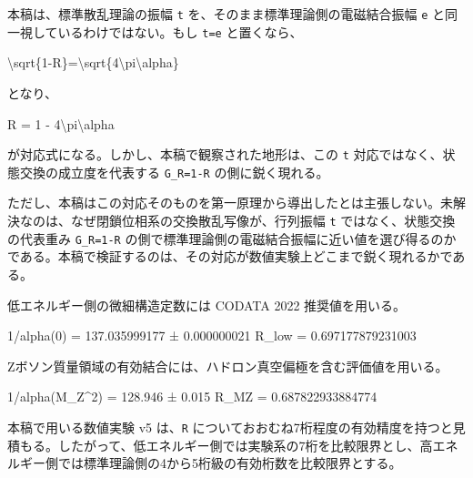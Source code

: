 \documentclass[
]{article}
\newenvironment{Shaded}{}{}
\newcommand{\NormalTok}[1]{#1}
\begin{document}
本稿は、標準散乱理論の振幅 \texttt{\textbar{}t\textbar{}}
を、そのまま標準理論側の電磁結合振幅 \texttt{e}
と同一視しているわけではない。もし \texttt{\textbar{}t\textbar{}=e}
と置くなら、

\begin{Shaded}
\begin{Highlighting}[]
\NormalTok{\textbackslash{}sqrt\{1{-}R\}=\textbackslash{}sqrt\{4\textbackslash{}pi\textbackslash{}alpha\}}
\end{Highlighting}
\end{Shaded}

となり、

\begin{Shaded}
\begin{Highlighting}[]
\NormalTok{R = 1 {-} 4\textbackslash{}pi\textbackslash{}alpha}
\end{Highlighting}
\end{Shaded}

が対応式になる。しかし、本稿で観察された地形は、この
\texttt{\textbar{}t\textbar{}} 対応ではなく、状態交換の成立度を代表する
\texttt{G\_R=1-R} の側に鋭く現れる。

ただし、本稿はこの対応そのものを第一原理から導出したとは主張しない。未解決なのは、なぜ閉鎖位相系の交換散乱写像が、行列振幅
\texttt{\textbar{}t\textbar{}} ではなく、状態交換の代表重み
\texttt{G\_R=1-R}
の側で標準理論側の電磁結合振幅に近い値を選び得るのかである。本稿で検証するのは、その対応が数値実験上どこまで鋭く現れるかである。

低エネルギー側の微細構造定数には CODATA 2022 推奨値を用いる。

\begin{Shaded}
\begin{Highlighting}[]
\NormalTok{1/alpha(0) = 137.035999177 ± 0.000000021}
\NormalTok{R\_low      = 0.697177879231003}
\end{Highlighting}
\end{Shaded}

Zボソン質量領域の有効結合には、ハドロン真空偏極を含む評価値を用いる。

\begin{Shaded}
\begin{Highlighting}[]
\NormalTok{1/alpha(M\_Z\^{}2) = 128.946 ± 0.015}
\NormalTok{R\_MZ           = 0.687822933884774}
\end{Highlighting}
\end{Shaded}

本稿で用いる数値実験 v5 は、\texttt{R}
についておおむね7桁程度の有効精度を持つと見積もる。したがって、低エネルギー側では実験系の7桁を比較限界とし、高エネルギー側では標準理論側の4から5桁級の有効桁数を比較限界とする。
\end{document}
